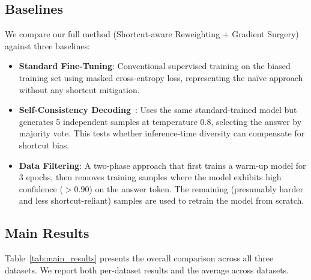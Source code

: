 \subsection{Baselines}
\label{sec:baselines}

We compare our full method (Shortcut-aware Reweighting + Gradient Surgery) against three baselines:

\begin{itemize}[leftmargin=*, itemsep=2pt]
    \item \textbf{Standard Fine-Tuning}: Conventional supervised training on the biased training set using masked cross-entropy loss, representing the na\"ive approach without any shortcut mitigation.
    \item \textbf{Self-Consistency Decoding}~\citep{wang2023selfconsistency}: Uses the same standard-trained model but generates 5 independent samples at temperature 0.8, selecting the answer by majority vote. This tests whether inference-time diversity can compensate for shortcut bias.
    \item \textbf{Data Filtering}: A two-phase approach that first trains a warm-up model for 3 epochs, then removes training samples where the model exhibits high confidence ($> 0.90$) on the answer token. The remaining (presumably harder and less shortcut-reliant) samples are used to retrain the model from scratch.
\end{itemize}

\subsection{Main Results}
\label{sec:main_results}

Table~\ref{tab:main_results} presents the overall comparison across all three datasets. We report both per-dataset results and the average across datasets.

